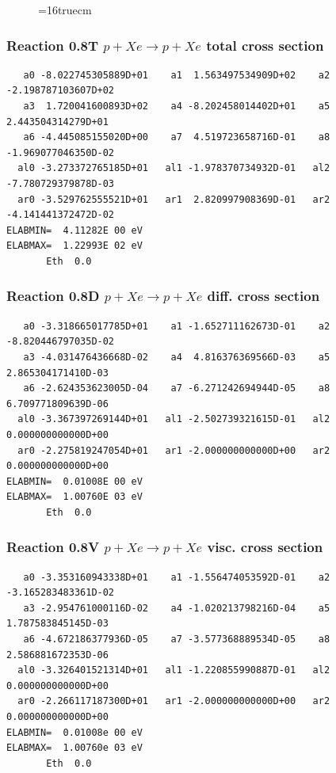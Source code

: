 \documentclass[12pt,dvipdfmx]{article}
\begin{document}
\begin{figure} \label{0.7}
\epsfxsize=16truecm
\end{figure}
\newpage


\subsubsection{
Reaction 0.8T   $ p + Xe \rightarrow p + Xe $ total cross
section }



\begin{small}\begin{verbatim}
   a0 -8.022745305889D+01    a1  1.563497534909D+02    a2 -2.198787103607D+02
   a3  1.720041600893D+02    a4 -8.202458014402D+01    a5  2.443504314279D+01
   a6 -4.445085155020D+00    a7  4.519723658716D-01    a8 -1.969077046350D-02
  al0 -3.273372765185D+01   al1 -1.978370734932D-01   al2 -7.780729379878D-03
  ar0 -3.529762555521D+01   ar1  2.820997908369D-01   ar2 -4.141441372472D-02
ELABMIN=  4.11282E 00 eV
ELABMAX=  1.22993E 02 eV
       Eth  0.0
\end{verbatim}\end{small}

\subsubsection{
Reaction 0.8D    $p + Xe \rightarrow p + Xe  $ diff. cross
section }


\begin{small}\begin{verbatim}
   a0 -3.318665017785D+01    a1 -1.652711162673D-01    a2 -8.820446797035D-02
   a3 -4.031476436668D-02    a4  4.816376369566D-03    a5  2.865304171410D-03
   a6 -2.624353623005D-04    a7 -6.271242694944D-05    a8  6.709771809639D-06
  al0 -3.367397269144D+01   al1 -2.502739321615D-01   al2  0.000000000000D+00
  ar0 -2.275819247054D+01   ar1 -2.000000000000D+00   ar2  0.000000000000D+00
ELABMIN=  0.01008E 00 eV
ELABMAX=  1.00760E 03 eV
       Eth  0.0
\end{verbatim}\end{small}

\subsubsection{
Reaction 0.8V   $ p + Xe \rightarrow p + Xe  $ visc. cross
section }


\begin{small}\begin{verbatim}
   a0 -3.353160943338D+01    a1 -1.556474053592D-01    a2 -3.165283483361D-02
   a3 -2.954761000116D-02    a4 -1.020213798216D-04    a5  1.787583845145D-03
   a6 -4.672186377936D-05    a7 -3.577368889534D-05    a8  2.586881672353D-06
  al0 -3.326401521314D+01   al1 -1.220855990887D-01   al2  0.000000000000D+00
  ar0 -2.266117187300D+01   ar1 -2.000000000000D+00   ar2  0.000000000000D+00
ELABMIN=  0.01008e 00 eV
ELABMAX=  1.00760e 03 eV
       Eth  0.0
\end{verbatim}\end{small}
\end{document}
